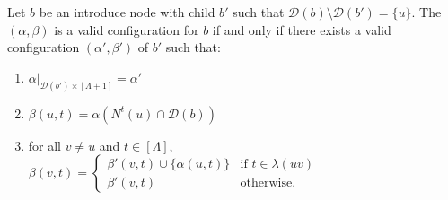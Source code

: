 \documentclass[runningheads]{llncs}
\begin{document}
\begin{lemmarep} \label{lem:intro node}
    Let $b$ be an introduce node with child $b'$ such that $\mathcal{D}(b) \setminus \mathcal{D}(b')=\{u\}$. The $(\alpha,\beta)$ is a valid configuration for $b$ if and only if there exists a valid configuration $(\alpha',\beta')$ of $b'$ such that: 
    \begin{enumerate}
        \item $\alpha|_{\mathcal{D}(b')\times[\Lambda+1]}=\alpha'$
        \item $\beta(u,t)=\alpha(N^t(u) \cap \mathcal{D}(b))$
        \item for all $v\neq u$ and $t \in[\Lambda]$, $\beta(v,t)=
        \begin{cases}
            \beta'(v,t) \cup \{\alpha(u,t)\} &\text{if } t \in \lambda(uv)\\
            \beta'(v,t) &\text{otherwise}.
        \end{cases} $ 
    \end{enumerate}
\end{lemmarep}
\end{document}
